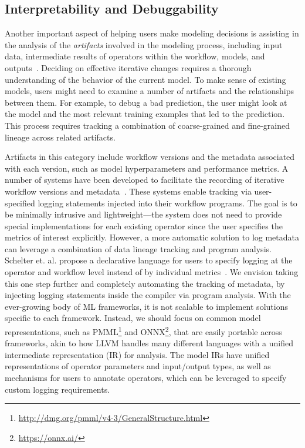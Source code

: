 \documentclass[11pt,dvipdfmx]{article}
\newcommand{\topic}[1]{\vspace{-3.5pt}\smallskip \smallskip \noindent{\bf #1.}}
\begin{document}
\subsection{Interpretability and Debuggability}
Another important aspect of helping users make modeling decisions is 
assisting in the analysis of the \textit{artifacts} involved in the modeling process, 
including input data, intermediate results of operators within the workflow, models, and outputs~\cite{Garcia2018}.
Deciding on effective iterative changes requires a thorough understanding of the behavior of the current model. 
To make sense of existing models, 
users might need to examine a number of artifacts and the relationships between them. 
For example, to debug a bad prediction, the user might look at the model and
the most relevant training examples
that led to the prediction.
This process requires tracking a combination of coarse-grained and fine-grained lineage across related artifacts.

\topic{Coarse-grained}
Artifacts in this category include workflow versions and the metadata associated with each version, such as model hyperparameters and performance metrics. 
A number of systems 
have been developed to facilitate the recording of iterative workflow versions and metadata~\cite{vartak2016m,zaharia2018accelerating,Garcia2018}. 
These systems enable tracking via user-specified logging statements injected into their workflow programs.
The goal is to be minimally intrusive and lightweight---the system does not need to provide special implementations for each existing operator since the user specifies the metrics of interest explicitly. 
However, a more automatic solution to log metadata can leverage a combination of data lineage tracking and program analysis. 
Schelter et. al. propose a declarative language for users to specify logging at the operator and workflow level instead of by individual metrics~\cite{schelter2017automatically}.
We envision taking this one step further and completely automating the tracking of metadata, by injecting logging statements inside the compiler via program analysis.
With the ever-growing body of ML frameworks, it is not scalable to implement solutions specific to each framework. 
Instead, we should focus on common model representations, such as PMML\footnote{\url{http://dmg.org/pmml/v4-3/GeneralStructure.html}} and ONNX\footnote{\url{https://onnx.ai/}}, that are easily portable across frameworks,
akin to how LLVM handles many different languages with a unified intermediate representation (IR) for analysis. 
The model IRs have unified representations of operator parameters and input/output types, as well as mechanisms for users to annotate operators, which can be leveraged to specify custom logging requirements. 
\end{document}
